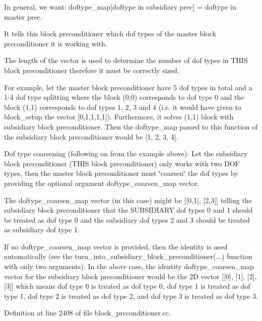 In general, we want\+: doftype\+\_\+map\mbox{[}doftype in subsidiary prec\mbox{]} = doftype in master prec.

It tells this block preconditioner which dof types of the master block preconditioner it is working with.

The length of the vector is used to determine the number of dof types in T\+H\+IS block preconditioner therefore it must be correctly sized.

For example, let the master block preconditioner have 5 dof types in total and a 1-\/4 dof type splitting where the block (0,0) corresponds to dof type 0 and the block (1,1) corresponds to dof types 1, 2, 3 and 4 (i.\+e. it would have given to block\+\_\+setup the vector \mbox{[}0,1,1,1,1\mbox{]}). Furthermore, it solves (1,1) block with subsidiary block preconditioner. Then the doftype\+\_\+map passed to this function of the subsidiary block preconditioner would be \mbox{[}1, 2, 3, 4\mbox{]}.

Dof type coarsening (following on from the example above)\+: Let the subsidiary block preconditioner (T\+H\+IS block preconditioner) only works with two D\+OF types, then the master block preconditioner must \char`\"{}coarsen\char`\"{} the dof types by providing the optional argument doftype\+\_\+coarsen\+\_\+map vector.

The doftype\+\_\+coarsen\+\_\+map vector (in this case) might be \mbox{[}\mbox{[}0,1\mbox{]}, \mbox{[}2,3\mbox{]}\mbox{]} telling the subsidiary block preconditioner that the S\+U\+B\+S\+I\+D\+I\+A\+RY dof types 0 and 1 should be treated as dof type 0 and the subsidiary dof types 2 and 3 should be treated as subsidiary dof type 1.

If no doftype\+\_\+coarsen\+\_\+map vector is provided, then the identity is used automatically (see the turn\+\_\+into\+\_\+subsidiary\+\_\+block\+\_\+preconditioner(...) function with only two arguments). In the above case, the identity doftype\+\_\+coarsen\+\_\+map vector for the subsidiary block preconditioner would be the 2D vector \mbox{[}\mbox{[}0\mbox{]}, \mbox{[}1\mbox{]}, \mbox{[}2\mbox{]}, \mbox{[}3\mbox{]}\mbox{]} which means dof type 0 is treated as dof type 0, dof type 1 is treated as dof type 1, dof type 2 is treated as dof type 2, and dof type 3 is treated as dof type 3. 

Definition at line 2408 of file block\+\_\+preconditioner.\+cc.

\mbox{\label{classoomph_1_1BlockPreconditioner_a46c57c6a2f4b54e27d2aaccc4ec90665}} 
